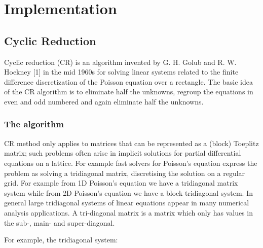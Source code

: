 \chapter{Implementation}

\section{Cyclic Reduction}


Cyclic reduction (CR) is an algorithm invented by G. H. Golub and R. W. Hoekney [1] in the mid 1960s for solving linear systems related to the finite difference discretization of the Poisson equation over a rectangle. 
The basic idea of the CR algorithm is to eliminate half the unknowns, regroup the equations in even and odd numbered and again eliminate half the unknowns.


\subsection{The algorithm}

CR method only applies to matrices that can be represented as a (block) Toeplitz matrix; such problems often arise in implicit solutions for partial differential equations on a lattice. For example fast solvers for Poisson's equation express the problem as solving a tridiagonal matrix, discretising the solution on a regular grid. For example from 1D Poisson’s equation we have a tridiagonal matrix system while from 2D Poisson’s equation we have a block tridiagonal system.
In general large tridiagonal systems of linear equations appear in many numerical analysis applications. A tri-diagonal matrix is a matrix which only has values in the sub-, main- and super-diagonal.

For example, the tridiagonal system:

